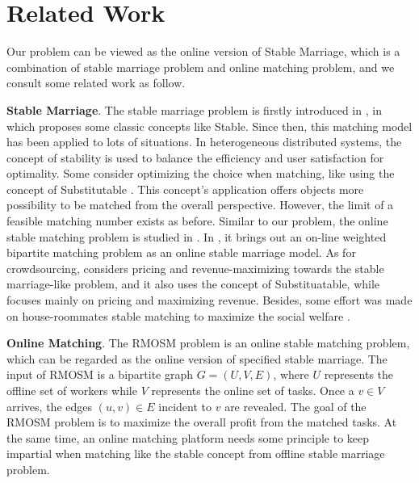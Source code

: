 \documentclass[color,twoside,amssymb,twocolumn]{article}
\begin{document}
\section{Related Work}

\noindent Our problem can be viewed as the online version of Stable Marriage\cite{gale1962college}, which is a combination of stable marriage problem and online matching problem, and we consult some related work as follow.

\textbf{Stable Marriage}. The stable marriage problem is firstly introduced in \cite{gale1962college}, in which proposes some classic concepts like Stable. Since then, this matching model has been applied to lots of situations\cite{gusfield1989stable,david2013algorithmics}. In heterogeneous distributed systems, the concept of stability is used to balance the efficiency and user satisfaction for optimality\cite{lee1999online}. Some consider optimizing the choice when matching, like using the concept of Substitutable \cite{deng2017complexity,xia2017revenue}. This concept's application offers objects more possibility to be matched from the overall perspective. However, the limit of a feasible matching number exists as before. Similar to our problem, 
the online stable matching problem is studied in \cite{khuller1994line,lee1999online}. In \cite{khuller1994line}, it brings out an on-line weighted bipartite matching problem as an online stable marriage model. As for crowdsourcing, \cite{xia2017revenue} considers pricing and revenue-maximizing towards the stable marriage-like problem, and it also uses the concept of Substituatable,  while \cite{xia2017revenue} focuses mainly on pricing and maximizing revenue. Besides, some effort was made on house-roommates stable matching to maximize the social welfare \cite{huzhang2017online}.

\textbf{Online Matching}. 
The RMOSM problem is an online stable matching problem, which can be regarded as the online version of specified stable marriage\cite{gale1962college}. The input of RMOSM is a bipartite graph $G=(U,V,E)$, where $U$ represents the offline set of workers while $V$ represents the online set of tasks. Once a $v \in V$ arrives, the edges $(u,v) \in E$ incident to $v$ are revealed. The goal of the RMOSM  problem is to maximize the overall profit from the matched tasks. At the same time, an online matching platform needs some principle to keep impartial when matching like the stable concept from offline stable marriage problem\cite{gale1962college}.
\end{document}
